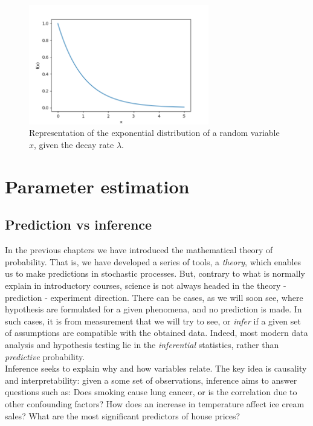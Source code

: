 \documentclass{book}
\begin{document}
\begin{figure}[ht]
    \centering
    \includegraphics[width=0.7\textwidth]{figures/chapter2/exponential.png}
    \caption{Representation of the exponential distribution of a random variable $x$, given the decay rate $\lambda$.}
    \label{fig:exponential1}
\end{figure}

\chapter{Parameter estimation}

\section{Prediction vs inference}

In the previous chapters we have introduced the mathematical theory of probability. That is, we have developed a series of tools, a \textit{theory}, which enables us to make predictions in stochastic processes. But, contrary to what is normally explain in introductory courses, science is not always headed in the theory - prediction - experiment direction. There can be cases, as we will soon see, where hypothesis are formulated for a given phenomena, and no prediction is made. In such cases, it is from measurement that we will try to see, or \textit{infer} if a given set of assumptions are compatible with the obtained data. Indeed, most modern data analysis and hypothesis testing lie in the \textit{inferential} statistics, rather than \textit{predictive} probability.\\

Inference seeks to explain why and how variables relate. The key idea is causality and interpretability: given a some set of observations, inference aims to answer questions such as: Does smoking cause lung cancer, or is the correlation due to other confounding factors? How does an increase in temperature affect ice cream sales? What are the most significant predictors of house prices?
\end{document}
